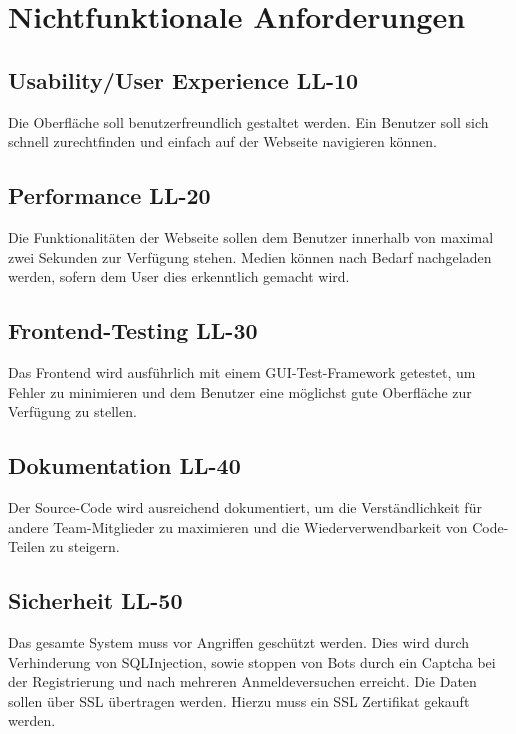 \documentclass[12pt,a4paper,oneside,ngerman]{scrartcl}
\begin{document}
\section{Nichtfunktionale Anforderungen}
\subsection[Usability/User Experience]{Usability/User Experience \hfill LL-10}
Die Oberfläche soll benutzerfreundlich gestaltet werden. Ein Benutzer soll sich schnell zurechtfinden und einfach auf der Webseite navigieren können. 

\subsection[Performance]{Performance \hfill LL-20}
Die Funktionalitäten der Webseite sollen dem Benutzer innerhalb von maximal zwei Sekunden zur Verfügung stehen. Medien können nach Bedarf nachgeladen werden, sofern dem User dies erkenntlich gemacht wird.

\subsection[Frontend-Testing]{Frontend-Testing \hfill LL-30}
Das Frontend wird ausführlich mit einem GUI-Test-Framework getestet, um Fehler zu minimieren und dem Benutzer eine möglichst gute Oberfläche zur Verfügung zu stellen.

\subsection[Dokumentation]{Dokumentation \hfill LL-40}
Der Source-Code wird ausreichend dokumentiert, um die Verständlichkeit für andere Team-Mitglieder zu maximieren und die Wiederverwendbarkeit von Code-Teilen zu steigern.

\subsection[Sicherheit]{Sicherheit \hfill LL-50}
Das gesamte System muss vor Angriffen geschützt werden. Dies wird durch Verhinderung von \gls{SQLInjection}, sowie stoppen von \gls{Bots} durch ein \gls{Captcha} bei der Registrierung und nach mehreren Anmeldeversuchen erreicht. Die Daten sollen über \gls{SSL} übertragen werden. Hierzu muss ein SSL Zertifikat gekauft werden.

\end{document}
